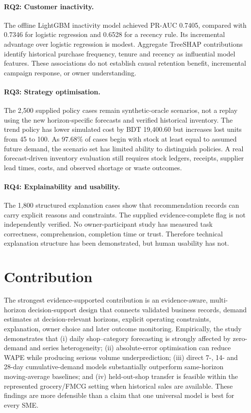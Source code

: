 \paragraph{RQ2: Customer inactivity.}
The offline LightGBM inactivity model achieved PR-AUC 0.7405, compared with 0.7346 for logistic regression and 0.6528 for a recency rule. Its incremental advantage over logistic regression is modest. Aggregate TreeSHAP contributions identify historical purchase frequency, tenure and recency as influential model features. These associations do not establish causal retention benefit, incremental campaign response, or owner understanding.

\paragraph{RQ3: Strategy optimisation.}
The 2,500 supplied policy cases remain synthetic-oracle scenarios, not a replay using the new horizon-specific forecasts and verified historical inventory. The trend policy has lower simulated cost by BDT 19,400.60 but increases lost units from 45 to 100. As 97.68\% of cases begin with stock at least equal to assumed future demand, the scenario set has limited ability to distinguish policies. A real forecast-driven inventory evaluation still requires stock ledgers, receipts, supplier lead times, costs, and observed shortage or waste outcomes.

\paragraph{RQ4: Explainability and usability.}
The 1,800 structured explanation cases show that recommendation records can carry explicit reasons and constraints. The supplied evidence-complete flag is not independently verified. No owner-participant study has measured task correctness, comprehension, completion time or trust. Therefore technical explanation structure has been demonstrated, but human usability has not.

\section{Contribution}

The strongest evidence-supported contribution is an evidence-aware, multi-horizon decision-support design that connects validated business records, demand estimates at decision-relevant horizons, explicit operating constraints, explanation, owner choice and later outcome monitoring. Empirically, the study demonstrates that (i) daily shop--category forecasting is strongly affected by zero-demand and series heterogeneity; (ii) absolute-error optimisation can reduce WAPE while producing serious volume underprediction; (iii) direct 7-, 14- and 28-day cumulative-demand models substantially outperform same-horizon moving-average baselines; and (iv) held-out-shop transfer is feasible within the represented grocery/FMCG setting when historical sales are available. These findings are more defensible than a claim that one universal model is best for every SME.

